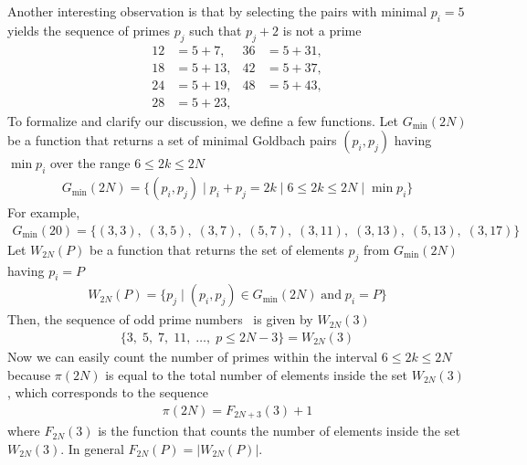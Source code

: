 Another interesting observation is that by selecting the pairs with minimal $p_i=5$ yields
the sequence of primes $p_j$ such that $p_j+2$ is not a prime
\begin{align*}
    12 &= 5 + 7,   & 36 &= 5 + 31, \\
    18 &= 5 + 13,  & 42 &= 5 + 37, \\
    24 &= 5 + 19,  & 48 &= 5 + 43, \\
    28 &= 5 + 23,  &
\end{align*}
To formalize and clarify our discussion, we define a few functions.
Let $G_{\min} (2N)$ be a function that returns a set of minimal Goldbach pairs $(p_i, p_j)$ having $\min p_i$
over the range $6 \leq 2k \leq 2N$
\begin{align*}
    G_{\min} (2N) = \{(p_i, p_j) \mid p_i + p_j = 2k \mid 6 \leq 2k \leq 2N \mid \min p_i \}
\end{align*}
For example,
\begin{align*}
    G_{\min}(20) = \{
    (3,3),\;
    (3,5),\;
    (3,7),\;
    (5,7),\;
    (3,11),\;
    (3,13),\;
    (5,13),\;
    (3,17)
    \}
\end{align*}
Let $W_{2N}(P)$ be a function that returns the set of elements $p_j$ from $G_{\min} (2N)$ having $p_i=P$
\begin{align*}
    W_{2N}(P) = \{p_j \mid (p_i, p_j) \in G_{\min} (2N) \; \mathrm{and} \; p_i = P \}
\end{align*}
Then, the sequence of odd prime numbers~\cite{oeis:A065091} is given by $W_{2N}(3)$
\begin{align*}
    \{ 3, \; 5, \; 7, \; 11, \; \dots, \; p \leq 2N - 3\} = W_{2N}(3)
\end{align*}
Now we can easily count the number of primes within the interval $6 \leq 2k \leq 2N$ because $\pi(2N)$ is equal to
the total number of elements inside the set $W_{2N}(3)$, which corresponds to the sequence~\cite{oeis_A000720}
\begin{align*}
    \pi(2N) = F_{2N+3}(3) + 1
\end{align*}
where $F_{2N}(3)$ is the function that counts the number of elements inside the set $W_{2N}(3)$.
In general $F_{2N}(P) = |W_{2N}(P)|$.

